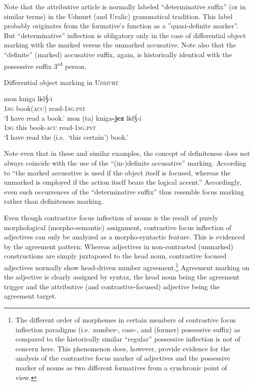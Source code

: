 Note that the attributive article is normally labeled “determinative suffix” (or in similar terms) in the Udmurt (and Uralic) grammatical tradition. This label probably originates from the formative's function as a ”quasi-definite marker”. But “determinative” inflection is obligatory only in the case of differential object marking with the marked versus the unmarked accusative. Note also that the “definite” (marked) accusative suffix, again, is historically identical with the possessive suffix 3\textsuperscript{rd} person.%
\begin{exe}
\ex Differential object marking in \textsc{Udmurt} \citep[22]{winkler2001}
\begin{xlist}
\ex
\gll	mon kniga lɨdǯ́-i\\
	\textsc{1sg} book(\textsc{acc}) read-\textsc{1sg.pst}\\
\glt	‘I have read a book.’
\ex	
\gll	mon (ta) kniga\textbf{-jez} lɨdǯ́-i\\
	\textsc{1sg} this book-\textsc{acc} read-\textsc{1sg.pst}\\
\glt	‘I have read the (i.e.~‘this certain’) book.’
\end{xlist}
\end{exe}
Note even that in these and similar examples, the concept of definiteness does not always coincide with the use of the “(in-)definite accusative” marking. According to \citet[21]{winkler2001} “the marked accusative is used if the object itself is focused, whereas the unmarked is employed if the action itself bears the logical accent.” Accordingly, even such occurrences of the “determinative suffix” thus resemble focus marking rather than definiteness marking.

Even though contrastive focus inflection of nouns is the result of purely morphological (morpho-semantic) assignment, contrastive focus inflection of adjectives can only be analyzed as a morpho-syntactic feature. This is evidenced by the agreement pattern: Whereas adjectives in non-contrasted (unmarked) constructions are simply juxtaposed to the head noun, contrastive focused adjectives normally show head-driven number agreement.\footnote{The different order of morphemes in certain members of contrastive focus inflection paradigms (i.e.~number-, case-, and (former) possessive suffix) as compared to the historically similar “regular” possessive inflection \citep[32]{winkler2001} is not of concern here. This phenomenon does, however, provide evidence for the analysis of the contrastive focus marker of adjectives and the possessive marker of nouns as two different formatives from a synchronic point of view.} Agreement marking on the adjective is clearly assigned by syntax, the head noun being the agreement trigger and the attributive (and contrastive-focused) adjective being the agreement target.

